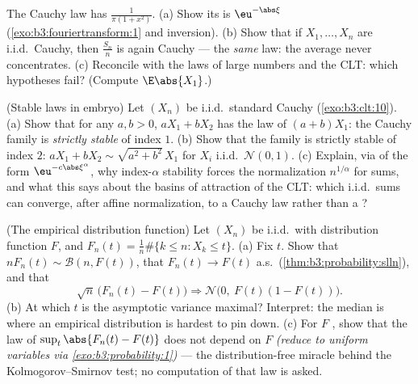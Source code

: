 \begin{exercise}[$\star\star$]\label{exo:b3:clt:10}
The Cauchy law has  $\frac1{\pi(1 + x^2)}$.
(a) Show its  is $\eu^{-\abs\xi}$
(\cref{exo:b3:fouriertransform:1} and inversion).
(b) Show that if $X_1, \dots, X_n$ are i.i.d.\ Cauchy, then
$\frac{S_n}n$ is again Cauchy --- the \emph{same} law: the
average never concentrates.
(c) Reconcile with the laws of large numbers and the CLT:
which hypotheses fail? (Compute $\E\abs{X_1}$.)
\end{exercise}

\begin{exercise}[$\star\star$]\label{exo:b3:clt:11}
(Stable laws in embryo) Let $(X_n)$ be i.i.d.\ standard
Cauchy (\cref{exo:b3:clt:10}).
(a) Show that for any $a, b > 0$, $aX_1 + bX_2$ has the law
of $(a + b)X_1$: the Cauchy family is \emph{strictly
stable} of index $1$.
(b) Show that the  family is strictly stable of
index $2$: $aX_1 + bX_2 \sim \sqrt{a^2 + b^2}\,X_1$ for
$X_i$ i.i.d.\ $\mathcal N(0,1)$.
(c) Explain, via  of the form
$\eu^{-c\abs\xi^\alpha}$, why index-$\alpha$ stability
forces the normalization $n^{1/\alpha}$ for sums, and what
this says about the basins of attraction of the CLT: which
i.i.d.\ sums can converge, after affine normalization, to a
Cauchy law rather than a ?
\end{exercise}

\begin{exercise}[$\star\star$]\label{exo:b3:clt:12}
(The empirical distribution function) Let $(X_n)$ be i.i.d.\
with distribution function $F$, and $F_n(t) =
\frac1n\#\{k \leq n : X_k \leq t\}$.
(a) Fix $t$. Show that $n F_n(t) \sim \mathcal B(n, F(t))$,
that $F_n(t) \to F(t)$ a.s.\ (\cref{thm:b3:probability:slln}),
and that
\[
\sqrt n\,\bigl(F_n(t) - F(t)\bigr) \Longrightarrow
\mathcal N\bigl(0,\ F(t)(1 - F(t))\bigr) .
\]
(b) At which $t$ is the asymptotic variance maximal?
Interpret: the median is where an empirical distribution is
hardest to pin down.
(c) For $F$ , show that the law of
$\sup_t\abs{F_n(t) - F(t)}$ does not depend on $F$
\emph{(reduce to uniform variables via
\cref{exo:b3:probability:1})} --- the distribution-free
miracle behind the Kolmogorov--Smirnov test; no computation
of that law is asked.
\end{exercise}

